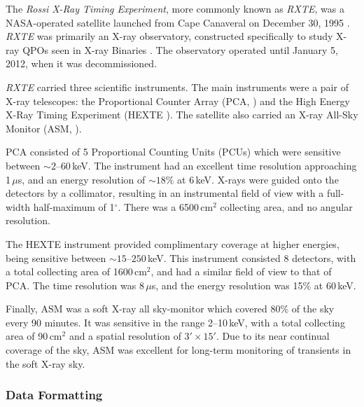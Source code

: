 \par The \textit{Rossi X-Ray Timing Experiment}, more commonly known as \textit{RXTE}, was a NASA-operated satellite launched from Cape Canaveral on December 30, 1995 \citep{Bradt_RXTE}.  \textit{RXTE} was primarily an X-ray observatory, constructed specifically to study X-ray QPOs seen in X-ray Binaries \citep{Bradt_XTEaims}.  The observatory operated until January 5, 2012, when it was decommissioned.
\par \textit{RXTE} carried three scientific instruments.  The main instruments were a pair of X-ray telescopes: the Proportional Counter Array (PCA, \citealp{Jahoda_PCA}) and the High Energy X-Ray Timing Experiment (HEXTE \citealp{Gruber_HEXTE}).  The satellite also carried an X-ray All-Sky Monitor (ASM, \citealp{Levine_ASM}).
\par PCA consisted of 5 Proportional Counting Units (PCUs) which were sensitive between $\sim2$--$60$\,keV.  The instrument had an excellent time resolution approaching 1\,$\mu$s, and an energy resolution of $\sim18\%$ at 6\,keV.  X-rays were guided onto the detectors by a collimator, resulting in an instrumental field of view with a full-width half-maximum of 1$^\circ$.  There was a 6500\,cm$^2$ collecting area, and no angular resolution.
\par The HEXTE instrument provided complimentary coverage at higher energies, being sensitive between $\sim15$--$250$\,keV.  This instrument consisted 8 detectors, with a total collecting area of 1600\,cm$^2$, and had a similar field of view to that of PCA.  The time resolution was 8\,$\mu$s, and the energy resolution was 15\% at 60\,keV.
\par Finally, ASM was a soft X-ray all sky-monitor which covered 80\% of the sky every 90 minutes.  It was sensitive in the range 2--10\,keV, with a total collecting area of 90\,cm$^2$ and a spatial resolution of $3'\times15'$.  Due to its near continual coverage of the sky, ASM was excellent for long-term monitoring of transients in the soft X-ray sky.

\subsubsection{Data Formatting}


